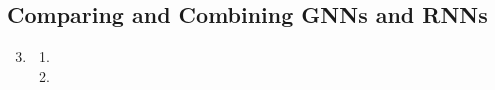 \documentclass{article}
\begin{document}
\subsection{Comparing and Combining GNNs and RNNs}

\begin{enumerate}[label=\textbf{3.\arabic*}]
  \setcounter{enumi}{2}
  \item

  \begin{enumerate}[label=\textbf{(\alph*)}]
    \item
    \item
  \end{enumerate}
\end{enumerate}

\end{document}

